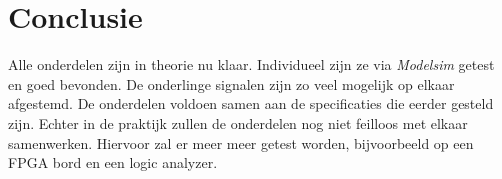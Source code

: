 \chapter{Conclusie}

Alle onderdelen zijn in theorie nu klaar. Individueel zijn ze via \emph{Modelsim} getest en goed bevonden. De onderlinge signalen zijn zo veel mogelijk op elkaar afgestemd. De onderdelen voldoen samen aan de specificaties die eerder gesteld zijn. Echter in de praktijk zullen de onderdelen nog niet feilloos met elkaar samenwerken. Hiervoor zal er meer meer getest worden, bijvoorbeeld op een FPGA bord en een logic analyzer.
